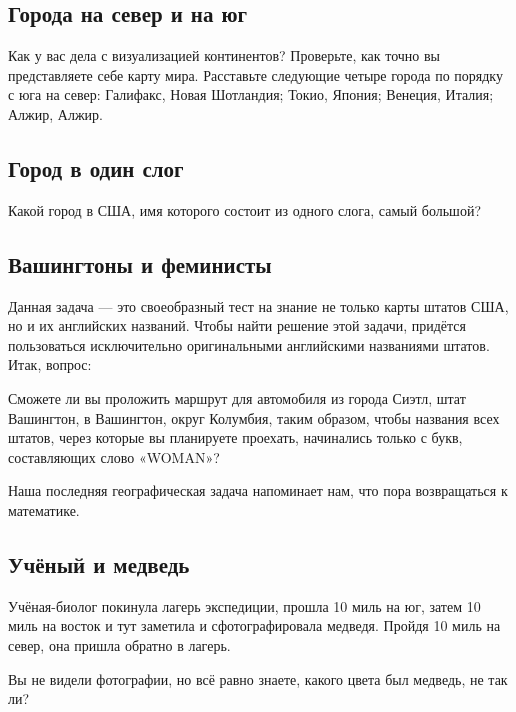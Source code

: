 \subsection*{Города на север и на юг}%

Как у вас дела с визуализацией континентов?
Проверьте, как точно вы представляете себе %
карту мира.
Расставьте следующие четыре города по порядку с юга на север: 
Галифакс, Новая Шотландия; %
Токио, Япония; %
Венеция, Италия; %
Алжир, Алжир. %

\subsection*{Город в один слог}%

Какой город в США, имя которого состоит из одного слога, самый большой? 

\subsection*{Вашингтоны и феминисты}%

Данная задача --- это своеобразный тест на знание не только карты штатов США, но и их английских названий.
Чтобы найти решение этой задачи, придётся пользоваться исключительно оригинальными английскими названиями штатов.
Итак, вопрос: 

Сможете ли вы проложить маршрут для автомобиля из города Сиэтл, штат Вашингтон, 
в Вашингтон, округ Колумбия, таким образом, чтобы 
названия всех штатов, через которые вы планируете проехать, начинались только с букв, составляющих слово «WOMAN»?


\medskip

Наша последняя географическая задача напоминает нам, что пора возвращаться к математике. %

\subsection*{Учёный и медведь}%

Учёная-биолог покинула лагерь экспедиции, прошла 10 миль на юг, затем 10 миль на восток и тут заметила и сфотографировала медведя.
Пройдя 10 миль на север, она пришла обратно в лагерь.

\medskip

Вы не видели фотографии, но всё равно знаете, какого цвета был медведь, не так ли?
